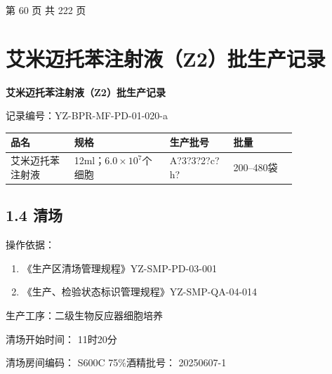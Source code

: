 \documentclass[UTF8,10pt,a4paper,fontset=fandol]{ctexart}
\newcommand{\fieldvalue}[1]{#1}
\newcommand{\handwritten}[1]{#1}
\begin{document}
\begin{center}
第 60 页 共 222 页
\end{center}

\newpage

\section{艾米迈托苯注射液（Z2）批生产记录}

\begin{center}
\textbf{艾米迈托苯注射液（Z2）批生产记录}
\end{center}

\noindent
记录编号：YZ-BPR-MF-PD-01-020-a

\begin{center}
\begin{tabular}{|p{0.18\linewidth}|p{0.27\linewidth}|p{0.18\linewidth}|p{0.18\linewidth}|}
\hline
品名 & 规格 & 生产批号 & 批量 \\
\hline
艾米迈托苯注射液 & 12ml；$6.0\times10^{7}$个细胞 &
\fieldvalue{\handwritten{A?3?3?2?c?h?}} &
200--480袋 \\
\hline
\end{tabular}
\end{center}

\subsection{1.4 清场}

\noindent
操作依据：

\begin{enumerate}
\item 《生产区清场管理规程》\hfill YZ-SMP-PD-03-001
\item 《生产、检验状态标识管理规程》\hfill YZ-SMP-QA-04-014
\end{enumerate}

\noindent
生产工序：二级生物反应器细胞培养

\noindent
清场开始时间：
\fieldvalue{\handwritten{11时20分}}

\medskip

\noindent
清场房间编码：
\fieldvalue{\handwritten{S600C}}
\hfill
75\%酒精批号：
\fieldvalue{\handwritten{20250607-1}}
\end{document}
